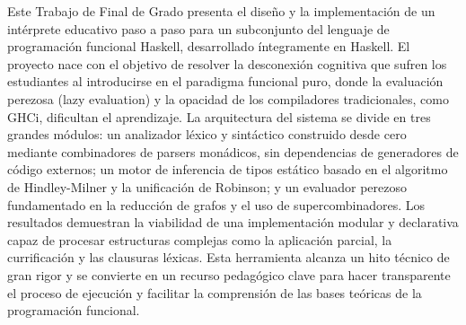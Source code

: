 Este Trabajo de Final de Grado presenta el diseño y la implementación de un intérprete educativo paso a paso para un subconjunto del lenguaje de programación funcional Haskell, desarrollado íntegramente en Haskell. El proyecto nace con el objetivo de resolver la desconexión cognitiva que sufren los estudiantes al introducirse en el paradigma funcional puro, donde la evaluación perezosa (lazy evaluation) y la opacidad de los compiladores tradicionales, como GHCi, dificultan el aprendizaje. La arquitectura del sistema se divide en tres grandes módulos: un analizador léxico y sintáctico construido desde cero mediante combinadores de parsers monádicos, sin dependencias de generadores de código externos; un motor de inferencia de tipos estático basado en el algoritmo de Hindley-Milner y la unificación de Robinson; y un evaluador perezoso fundamentado en la reducción de grafos y el uso de supercombinadores. Los resultados demuestran la viabilidad de una implementación modular y declarativa capaz de procesar estructuras complejas como la aplicación parcial, la currificación y las clausuras léxicas. Esta herramienta alcanza un hito técnico de gran rigor y se convierte en un recurso pedagógico clave para hacer transparente el proceso de ejecución y facilitar la comprensión de las bases teóricas de la programación funcional.